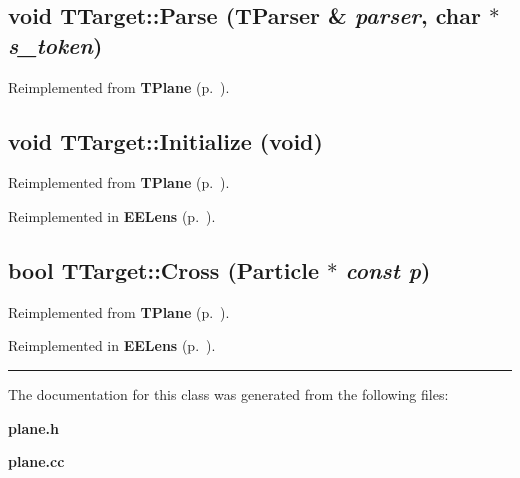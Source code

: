 \subsection{\setlength{\rightskip}{0pt plus 5cm}void TTarget::Parse ({\bf TParser} \& {\em parser}, char $\ast$ {\em s\_\-token})\hspace{0.3cm}{\tt  [virtual]}}



Reimplemented from {\bf TPlane} {\rm (p.~\pageref{TPlane_a2})}.\label{TTarget_a2}
\subsection{\setlength{\rightskip}{0pt plus 5cm}void TTarget::Initialize (void)\hspace{0.3cm}{\tt  [virtual]}}



Reimplemented from {\bf TPlane} {\rm (p.~\pageref{TPlane_a3})}.

Reimplemented in {\bf EELens} {\rm (p.~\pageref{EELens_a1})}.\label{TTarget_a3}
\subsection{\setlength{\rightskip}{0pt plus 5cm}bool TTarget::Cross ({\bf Particle} $\ast$ {\em const p})\hspace{0.3cm}{\tt  [virtual]}}



Reimplemented from {\bf TPlane} {\rm (p.~\pageref{TPlane_a4})}.

Reimplemented in {\bf EELens} {\rm (p.~\pageref{EELens_a2})}.\vspace{0.4cm}\hrule\vspace{0.2cm}
The documentation for this class was generated from the following files:\begin{CompactItemize}
\item 
{\bf plane.h}\item 
{\bf plane.cc}\end{CompactItemize}
